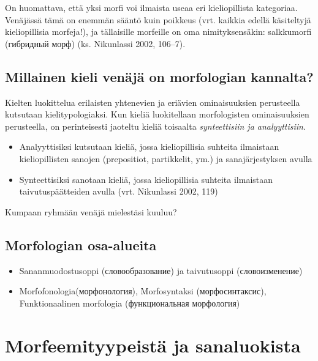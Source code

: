 \documentclass[]{scrreprt}
\providecommand{\tightlist}{%
  \setlength{\itemsep}{0pt}\setlength{\parskip}{0pt}}
\begin{document}
On huomattava, että yksi morfi voi ilmaista useaa eri kieliopillista
kategoriaa. Venäjässä tämä on enemmän sääntö kuin poikkeus (vrt. kaikkia
edellä käsiteltyjä kieliopillisia morfeja!), ja tällaisille morfeille on
oma nimityksensäkin: salkkumorfi (гибридный морф) (ks. Nikunlassi 2002,
106--7).

\section{Millainen kieli venäjä on morfologian
kannalta?}\label{millainen-kieli-venuxe4juxe4-on-morfologian-kannalta}

Kielten luokittelua erilaisten yhtenevien ja eriävien ominaisuuksien
perusteella kutsutaan kielitypologiaksi. Kun kieliä luokitellaan
morfologisten ominaisuuksien perusteella, on perinteisesti jaoteltu
kieliä toisaalta \emph{synteettisiin ja analyyttisiin}.

\begin{itemize}
\tightlist
\item
  Analyyttisiksi kutsutaan kieliä, jossa kieliopillisia suhteita
  ilmaistaan kieliopillisten sanojen (prepositiot, partikkelit, ym.) ja
  sanajärjestyksen avulla
\item
  Synteettisiksi sanotaan kieliä, jossa kieliopillisia suhteita
  ilmaistaan taivutuspäätteiden avulla (vrt. Nikunlassi 2002, 119)
\end{itemize}

Kumpaan ryhmään venäjä mielestäsi kuuluu?

\section{Morfologian osa-alueita}\label{morfologian-osa-alueita}

\begin{itemize}
\item
  Sananmuodostusoppi (словообразование) ja taivutusoppi (словоизменение)
\item
  Morfofonologia(морфонология), Morfosyntaksi (морфосинтаксис),
  Funktionaalinen morfologia (функциональная морфология)
\end{itemize}

\chapter{Morfeemityypeistä ja
sanaluokista}\label{luento-2-morfeemityypeistuxe4-ja-sanaluokista}

\
\end{document}
